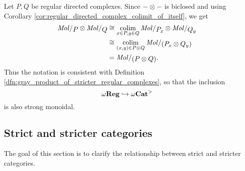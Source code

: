 \begin{rmk}
    Let \( P, Q \) be regular directed complexes.
    Since \( - \otimes - \) is biclosed and using Corollary \ref{cor:regular_directed_complex_colimit_of_itself}, we get
    \begin{align*}
        \molecin{P} \gray \molecin{Q} &\cong \colim_{x \in P, y \in Q} \molecin{\imel{P}{x}} \gray \molecin{\imel{Q}{y}} \\
                                      &\cong \colim_{(x, y) \in P \gray Q} \molecin{(\imel{P}{x} \gray \imel{Q}{y})} \\
                                      &= \molecin{(P \gray Q)}.
    \end{align*}
    Thus the notation is consistent with Definition \ref{dfn:gray_product_of_stricter_regular_complexes}, so that the inclusion
    \begin{equation*}
        \omega\mathbf{Reg} \hookrightarrow {\omega\mathbf{Cat}}^>
    \end{equation*}
    is also strong monoidal.
\end{rmk}

\subsection{Strict and stricter categories}

The goal of this section is to clarify the relationship between strict and stricter categories.

